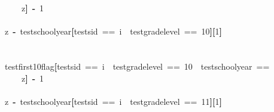 \documentclass[12pt]{article}
\makeatletter
\newcommand{\hlnumber}[1]{\textcolor[rgb]{0,0,0}{#1}}%
\newcommand{\hlkeyword}[1]{\textcolor[rgb]{0,0,0}{\textbf{#1}}}%
\newcommand{\hlassignement}[1]{\textcolor[rgb]{0,0,0}{\textbf{#1}}}%
\newcommand{\hlsymbol}[1]{\textcolor[rgb]{0,0,0}{#1}}%
\newcommand{\hlstd}[1]{\textcolor[rgb]{0,0,0}{#1}}%
\newenvironment{kframe}{%
 \def\FrameCommand##1{\hskip\@totalleftmargin \hskip-\fboxsep
 \colorbox{shadecolor}{##1}\hskip-\fboxsep
     \hskip-\linewidth \hskip-\@totalleftmargin \hskip\columnwidth}%
 \MakeFramed {\advance\hsize-\width
   \@totalleftmargin\z@ \linewidth\hsize
   \@setminipage}}%
 {\par\unskip\endMakeFramed}
\newenvironment{knitrout}{}{} %
\renewenvironment{knitrout}{\begin{footnotesize}}{\end{footnotesize}}
\makeatother
\begin{document}
\begin{knitrout}
\begin{kframe}
\begin{flushleft}
\hlstd{}{\ }{\ }{\ }{\ }{\ }{\ }{\ }{\ }\hlsymbol{z}\hlkeyword{]}{\ }\hlassignement{\usebox{\hlnormalsizeboxlessthan}-}{\ }\hlnumber{1}\hspace*{\fill}\\
\hlstd{}\hspace*{\fill}\\
\hlstd{}{\ }{\ }{\ }{\ }\hlsymbol{z}{\ }\hlassignement{\usebox{\hlnormalsizeboxlessthan}-}{\ }\hlsymbol{test}\hlkeyword{\usebox{\hlnormalsizeboxdollar}}\hlsymbol{school\usebox{\hlnormalsizeboxunderscore}year}\hlkeyword{[}\hlsymbol{test}\hlkeyword{\usebox{\hlnormalsizeboxdollar}}\hlsymbol{sid}{\ }=={\ }\hlsymbol{i}{\ }\hlkeyword{\usebox{\hlnormalsizeboxand}}{\ }\hlsymbol{test}\hlkeyword{\usebox{\hlnormalsizeboxdollar}}\hlsymbol{grade\usebox{\hlnormalsizeboxunderscore}level}{\ }=={\ }\hlnumber{10}\hlkeyword{]}\hlkeyword{[}\hlnumber{1}\hlkeyword{]}\hspace*{\fill}\\
\hlstd{}\hspace*{\fill}\\
\hlstd{}\hspace*{\fill}\\
\hlstd{}{\ }{\ }{\ }{\ }\hlsymbol{test}\hlkeyword{\usebox{\hlnormalsizeboxdollar}}\hlsymbol{first10\usebox{\hlnormalsizeboxunderscore}flag}\hlkeyword{[}\hlsymbol{test}\hlkeyword{\usebox{\hlnormalsizeboxdollar}}\hlsymbol{sid}{\ }=={\ }\hlsymbol{i}{\ }\hlkeyword{\usebox{\hlnormalsizeboxand}}{\ }\hlsymbol{test}\hlkeyword{\usebox{\hlnormalsizeboxdollar}}\hlsymbol{grade\usebox{\hlnormalsizeboxunderscore}level}{\ }=={\ }\hlnumber{10}{\ }\hlkeyword{\usebox{\hlnormalsizeboxand}}{\ }\hlsymbol{test}\hlkeyword{\usebox{\hlnormalsizeboxdollar}}\hlsymbol{school\usebox{\hlnormalsizeboxunderscore}year}{\ }==\hspace*{\fill}\\
\hlstd{}{\ }{\ }{\ }{\ }{\ }{\ }{\ }{\ }\hlsymbol{z}\hlkeyword{]}{\ }\hlassignement{\usebox{\hlnormalsizeboxlessthan}-}{\ }\hlnumber{1}\hspace*{\fill}\\
\hlstd{}\hspace*{\fill}\\
\hlstd{}{\ }{\ }{\ }{\ }\hlsymbol{z}{\ }\hlassignement{\usebox{\hlnormalsizeboxlessthan}-}{\ }\hlsymbol{test}\hlkeyword{\usebox{\hlnormalsizeboxdollar}}\hlsymbol{school\usebox{\hlnormalsizeboxunderscore}year}\hlkeyword{[}\hlsymbol{test}\hlkeyword{\usebox{\hlnormalsizeboxdollar}}\hlsymbol{sid}{\ }=={\ }\hlsymbol{i}{\ }\hlkeyword{\usebox{\hlnormalsizeboxand}}{\ }\hlsymbol{test}\hlkeyword{\usebox{\hlnormalsizeboxdollar}}\hlsymbol{grade\usebox{\hlnormalsizeboxunderscore}level}{\ }=={\ }\hlnumber{11}\hlkeyword{]}\hlkeyword{[}\hlnumber{1}\hlkeyword{]}\hspace*{\fill}\\

\end{flushleft}
\end{kframe}
\end{knitrout}
\end{document}
